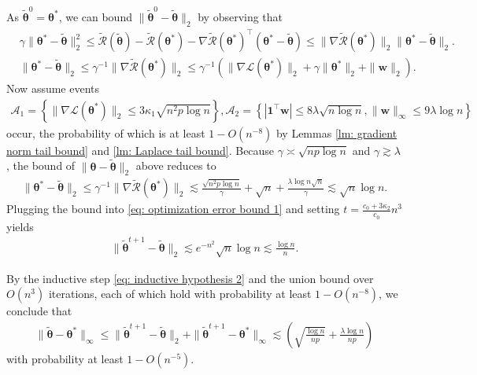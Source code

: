 \documentclass[letterpaper,12pt]{article}
\numberwithin{equation}{section}
\theoremstyle{plain}
\numberwithin{Theorem}{section}
\numberwithin{corollary}{section}
\numberwithin{proposition}{section}
\numberwithin{Lemma}{section}
{
	\theoremstyle{definition}
	\newtheorem{Definition}{Definition}
	\newtheorem{example}{Example}
	\numberwithin{example}{section}
	\newtheorem{fact}{Fact}
	\numberwithin{fact}{section}
	\newtheorem{remark}{Remark}
}
\newcommand{\1}{\mathbbm{1}}
\def\bth{{\boldsymbol{\theta}}}
\begin{document}
As $\widetilde\bth^0 = \bth^*$, we can bound $\|\widetilde\bth^{0} - \widetilde\bth\|_2$ by observing that
\begin{align*}
	&\gamma\|\bth^*- \widetilde\bth\|^2_2 \leq \widetilde{\mathcal R}(\widetilde\bth) - \widetilde{\mathcal R}(\bth^*) - \nabla\widetilde{\mathcal R}(\bth^*)^\top(\bth^* - \widetilde\bth) \leq \|\nabla\widetilde{\mathcal R}(\bth^*)\|_2\|\bth^*- \widetilde\bth\|_2.\\
	& \|\bth^*- \widetilde\bth\|_2 \leq \gamma^{-1}\|\nabla\widetilde{\mathcal R}(\bth^*)\|_2 \leq \gamma^{-1}\left(\|\nabla\mathcal L(\bth^*)\|_2 + \gamma\|\bth^*\|_2 + \|\bm w\|_2 \right).
\end{align*}
Now assume events 
\begin{align*}
	\mathcal A_1 = \left\{\|\nabla \mathcal L(\bth^*)\|_2 \leq 3\kappa_1\sqrt{n^2p\log n}\right\}, \mathcal A_2 = \left\{|\bm1^\top \bm w| \leq 8\lambda\sqrt{n\log n}, \|\bm w\|_\infty \leq 9\lambda\log n \right\}
\end{align*}
occur, the probability of which is at least $1 - O(n^{-8})$ by Lemmas \ref{lm: gradient norm tail bound} and \ref{lm: Laplace tail bound}. Because $\gamma \asymp \sqrt{np\log n}$ and $\gamma \gtrsim \lambda$, the bound of $ \|\bth- \widetilde\bth\|_2 $ above reduces to
\begin{align*}
	\|\bth^*- \widetilde\bth\|_2 \leq \gamma^{-1}\|\nabla\widetilde{\mathcal R}(\bth^*)\|_2 \lesssim \frac{\sqrt{n^2 p \log n}}{\gamma} + \sqrt{n}  + \frac{\lambda\log n\sqrt{n}}{\gamma} \lesssim \sqrt{n}\log n.
\end{align*}
Plugging the bound into \eqref{eq: optimization error bound 1} and setting $t = \frac{c_0+3\kappa_2}{c_0}n^3$ yields
\begin{align*}
	\|\widetilde\bth^{t+1} - \widetilde\bth\|_2 \lesssim e^{-n^2}\sqrt{n}\log n \lesssim \frac{\log n}{n}.
\end{align*}

By the inductive step \eqref{eq: inductive hypothesis 2} and the union bound over $O(n^3)$ iterations, each of which hold with probability at least $1 - O(n^{-8})$, we conclude that
\begin{align*}
	\|\widetilde\bth-\bth^*\|_\infty \leq \|\widetilde\bth^{t+1} - \widetilde\bth\|_2 + \|\widetilde\bth^{t+1} - \bth^*\|_\infty \lesssim \left(\sqrt{\frac{\log n}{np}} + \frac{\lambda\log n}{np}\right)
\end{align*} 
with probability at least $1 - O(n^{-5})$.
\end{document}
